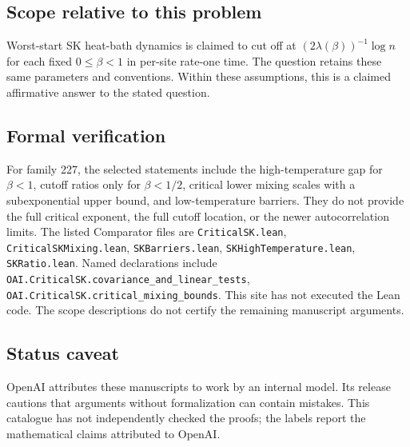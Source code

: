 \documentclass[11pt]{article}
\begin{document}
\subsection{Scope relative to this problem}
Worst-start SK heat-bath dynamics is claimed to cut off at $(2\lambda(\beta))^{-1}\log n$ for each fixed $0\leq\beta<1$ in per-site rate-one time. The question retains these same parameters and conventions. Within these assumptions, this is a claimed affirmative answer to the stated question.

\subsection{Formal verification}
For family 227, the selected statements include the high-temperature gap for $\beta<1$, cutoff ratios only for $\beta<1/2$, critical lower mixing scales with a subexponential upper bound, and low-temperature barriers. They do not provide the full critical exponent, the full cutoff location, or the newer autocorrelation limits. The listed Comparator files are \texttt{CriticalSK.lean}, \texttt{CriticalSKMixing.lean}, \texttt{SKBarriers.lean}, \texttt{SKHighTemperature.lean}, \texttt{SKRatio.lean}. Named declarations include \texttt{OAI.CriticalSK.covariance\_and\_linear\_tests}, \texttt{OAI.CriticalSK.critical\_mixing\_bounds}. This site has not executed the Lean code. The scope descriptions do not certify the remaining manuscript arguments.

\subsection{Status caveat}
OpenAI attributes these manuscripts to work by an internal model. Its release cautions that arguments without formalization can contain mistakes. This catalogue has not independently checked the proofs; the labels report the mathematical claims attributed to OpenAI.
\end{document}
